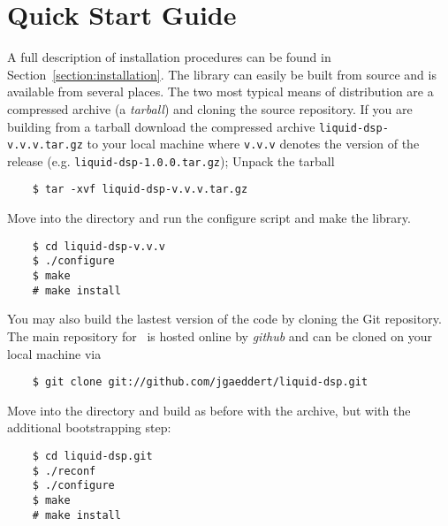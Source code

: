 %
%

\section{Quick Start Guide}
\label{section:quickstart}
A full description of installation procedures can be found in
Section~\ref{section:installation}.
The library can easily be built from source and is available from
several places.
The two most typical means of distribution are a compressed archive
(a {\em tarball}) and cloning the source repository.
If you are building from a tarball
download the compressed archive {\tt liquid-dsp-v.v.v.tar.gz} to your
local machine where {\tt v.v.v} denotes the version of the release
(e.g. {\tt liquid-dsp-1.0.0.tar.gz});
%
%
%
%
Unpack the tarball
%
\begin{verbatim}
    $ tar -xvf liquid-dsp-v.v.v.tar.gz
\end{verbatim}
%
Move into the directory and run the configure script and make the
library.
%
\begin{verbatim}
    $ cd liquid-dsp-v.v.v
    $ ./configure
    $ make
    # make install
\end{verbatim}
%
You may also build the lastest version of the code by cloning the
Git repository.
The main repository for \liquid\ is hosted online by {\em github}
\cite{github:web} and can be cloned on your local machine via
%
\begin{verbatim}
    $ git clone git://github.com/jgaeddert/liquid-dsp.git
\end{verbatim}
%
Move into the directory and build as before with the archive,
but with the additional bootstrapping step:
%
\begin{verbatim}
    $ cd liquid-dsp.git
    $ ./reconf
    $ ./configure
    $ make
    # make install
\end{verbatim}
